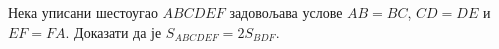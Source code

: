 Нека уписани шестоугао $ABCDEF$ задовољава услове $AB = BC$, $CD = DE$ и
$EF = FA$.
Доказати да је $S_{ABCDEF} = 2 S_{BDF}$.

\solution

